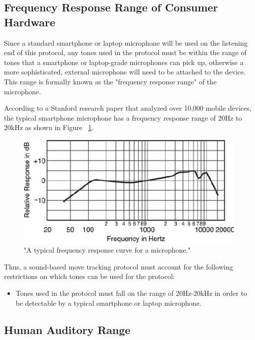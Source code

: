 \subsection{Frequency Response Range of Consumer Hardware}
\label{subsec:frequency-response-range}

Since a standard smartphone or laptop microphone will be used on the
listening end of this protocol, any tones used in the protocol must be
within the range of tones that a smartphone or laptop-grade microphones
can pick up, otherwise a more sophisticated, external microphone will
need to be attached to the device. This range is formally known as the
"frequency response range" of the microphone.

According to a Stanford research paper \cite{typical-mic-range} that
analyzed over 10,000 mobile devices, the typical smartphone microphone
has a frequency response range of 20Hz to 20kHz as shown in Figure
~\ref{fig:freq-res-range}.

\begin{figure}[h]
    \centering
    \caption{"A typical frequency response curve for a microphone." \cite{typical-mic-range}}
    \label{fig:freq-res-range}
    \includegraphics[width=.50\linewidth]{Figures/4 Protocol Design/Frequency Response Range/typical-smartphone-response-range.png}
\end{figure}

Thus, a sound-based move tracking protocol must account for the
following restrictions on which tones can be used for the protocol:

\begin{itemize}

    \item Tones used in the protocol must fall on the range of
    20Hz-20kHz in order to be detectable by a typical smartphone or
    laptop microphone.

\end{itemize}

\subsection{Human Auditory Range}
\label{subsec:human-auditory-range}

